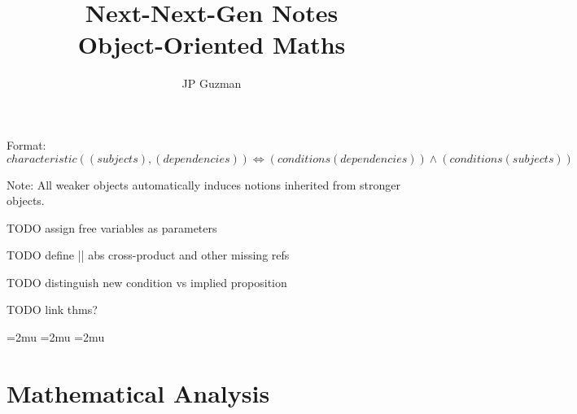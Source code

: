 \documentclass[a4paper]{article}
\title{Next-Next-Gen Notes \\
\large Object-Oriented Maths}
\author{JP Guzman}
\begin{document}
\maketitle
\allowdisplaybreaks

Format: $characteristic((subjects), (dependencies)) \iff (conditions(dependencies)) \land (conditions(subjects))$

Note: All weaker objects automatically induces notions inherited from stronger objects.

TODO assign free variables as parameters

TODO define || abs  cross-product and other missing refs

TODO distinguish new condition vs implied proposition

TODO link thms?

\thinmuskip=2mu %
\medmuskip=2mu %
\thickmuskip=2mu %
\setlength{\belowdisplayskip}{0pt} \setlength{\belowdisplayshortskip}{0pt}
\setlength{\abovedisplayskip}{0pt} \setlength{\abovedisplayshortskip}{0pt}

\section{Mathematical Analysis}
\end{document}
